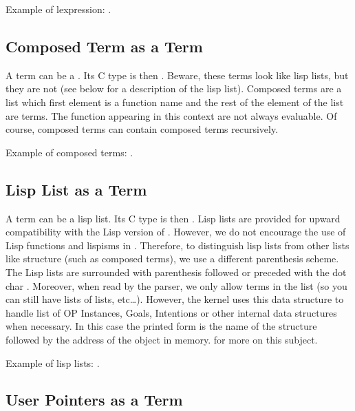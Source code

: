 Example of lexpression: .

\subsection{Composed Term as a Term}

A term can be a . Its C type is then .
Beware, these terms look like lisp lists, but they are not (see below for a
description of the lisp list). Composed terms are a list which first element is a
function name and the rest of the element of the list are terms. The function
appearing in this context are not always evaluable. Of course, composed terms
can contain composed terms recursively.

Example of composed terms: .

\subsection{Lisp List as a Term}

A term can be a lisp list. Its C type is then . Lisp lists are
provided for upward compatibility with the Lisp version of \OPRS{}. However, we
do not encourage the use of Lisp functions and lispisms in \COPRS{}. Therefore,
to distinguish lisp lists from other lists like structure (such as composed
terms), we use a different parenthesis scheme. The Lisp lists are surrounded
with parenthesis followed or preceded with the dot char .  Moreover,
when read by the parser, we only allow terms in the list (so you can still have
lists of lists, etc\dots{}). However, the kernel uses this data structure to
handle list of OP Instances, Goals, Intentions or other internal data structures
when necessary.  In this case the printed form is the name of the structure
followed by the address of the object in memory.  
for more on this subject.

Example of lisp lists: .

\subsection{User Pointers as a Term}

